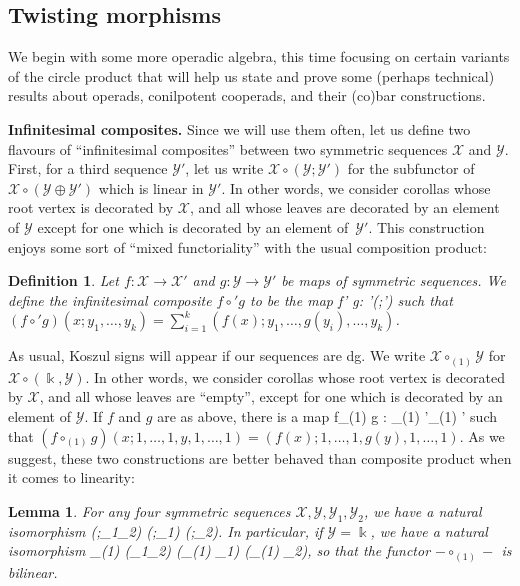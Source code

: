\documentclass[fleqn, a4paper, twoside]{article}
\makeatletter
\newcommand{\0}{\langle 0\rangle}
\newcommand{\XX}{\mathcal{X}}
\newcommand{\YY}{\mathcal{Y}}
\let\[\@undefined
\DeclareRobustCommand{\[}{\begin{equation}}%
\let\]\@undefined
\DeclareRobustCommand{\]}{\end{equation}}%
\theoremstyle{mytheorem}
\newtheorem{lemma}[theorem]{Lemma}
\theoremstyle{introthm}
\theoremstyle{mydefinition}
\newtheorem{definition}[theorem]{Definition}
\theoremstyle{mydefinition2}
\theoremstyle{plain} %
\newcommand{\?}{\,?\,}
\newcommand{\kk}{\Bbbk}
\theoremstyle{mytheorem}
\theoremstyle{plain} %
\makeatother
\begin{document}
\subsection{Twisting morphisms}

We begin with some more operadic algebra, this time focusing
on certain variants of the circle product that will help us
state and prove some (perhaps technical) results about
operads, conilpotent cooperads, and their (co)bar
constructions. 

\medskip

\textbf{Infinitesimal composites.}
Since we will use them often, let us define two flavours of
``infinitesimal composites''  between two symmetric sequences $\XX$ and $\YY$.
First, for a third sequence $\YY'$, let us write $\XX\circ (\YY;\YY')$
for the subfunctor of $\XX\circ (\YY\oplus \YY')$ which is linear
in $\YY'$. In other words,  we consider corollas whose root 
vertex is decorated by
$\XX$, and all whose leaves are  decorated by an element 
of $\YY$ except for one
which is decorated by an element of~$\YY'$. This construction
enjoys some sort of ``mixed functoriality'' with the usual
composition product:

\begin{definition}
Let $f:\XX \longrightarrow \XX'$ and $g: \YY\longrightarrow \YY'$
be maps of symmetric sequences. We define the infinitesimal
composite $f\circ' g$ to be the map
\[ f\circ' g: \XX\circ \YY \longrightarrow \XX'\circ (\YY;\YY') \]
such that
$(f\circ' g)(x;y_1,\ldots,y_k) = 
\sum_{i=1}^k (f(x);y_1,\ldots,g(y_i),\ldots,y_k)$.
\end{definition}

As usual, Koszul signs will appear if our sequences are dg.
We write $\XX\circ_{(1)} \YY$ for $\XX\circ (\kk,\YY)$. In other
words, we consider corollas whose root vertex is decorated by
$\XX$, and all whose leaves are ``empty'', except for one
which is decorated by an element of $\YY$. If $f$ and $g$
are as above, there is a map
\[
f\circ_{(1)} g : \XX\circ_{(1)} \YY \longrightarrow \XX'\circ_{(1)} \YY'
\]
such that $(f\circ_{(1)} g )(x;1,\ldots,1,y,1,\ldots,1) = 
 (f(x);1,\ldots,1,g(y),1,\ldots,1)$.
As we suggest,
these two constructions are better behaved than
composite product when it comes to linearity:

\begin{lemma}
For any four symmetric sequences $\XX,\YY,\YY_1,\YY_2$,
we have a natural isomorphism
\[ \XX\circ (\YY;\YY_1\oplus \YY_2) \longrightarrow 
				\XX\circ (\YY;\YY_1) \oplus \XX\circ (\YY;\YY_2).\]
In particular, if $\YY=\kk$, we have a natural isomorphism				
\[ \XX\circ_{(1)} (\YY_1\oplus \YY_2) \longrightarrow 
				(\XX\circ_{(1)} \YY_1) \oplus (\XX\circ_{(1)} \YY_2),\]
so that the functor $-\circ_{(1)}-$ is bilinear.
\end{lemma}
\end{document}
